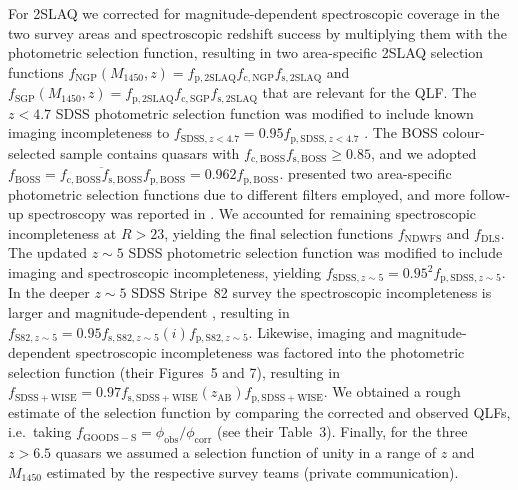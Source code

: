 \documentclass[fleqn,usenatbib]{mnras}
\begin{document}
For 2SLAQ we corrected for magnitude-dependent spectroscopic coverage
in the two survey areas \citep[$f_\mathrm{c,NGP}\left(g\right)$ and
  $f_\mathrm{c,SGP}\left(g\right)$; Figure~4
  in][]{2009MNRAS.392...19C} and spectroscopic redshift success
\citep[$f_\mathrm{s,2SLAQ}\left(g\right)$; Figure~6b
  in][]{2009MNRAS.392...19C} by multiplying them with the photometric
selection function, resulting in two area-specific 2SLAQ selection
functions
$f_\mathrm{NGP}\left(M_{1450},z\right)=f_\mathrm{p,2SLAQ}f_\mathrm{c,NGP}f_\mathrm{s,2SLAQ}$
and
$f_\mathrm{SGP}\left(M_{1450},z\right)=f_\mathrm{p,2SLAQ}f_\mathrm{c,SGP}f_\mathrm{s,2SLAQ}$
that are relevant for the QLF.  The $z<4.7$ SDSS photometric selection
function was modified to include known imaging incompleteness to
$f_{\mathrm{SDSS},z<4.7}=0.95f_{\mathrm{p,SDSS},z<4.7}$
\citep{2006AJ....131.2766R}. The BOSS colour-selected sample \citep{2013ApJ...773...14R} contains
quasars with $f_\mathrm{c,BOSS}f_\mathrm{s,BOSS}\ge 0.85$, and we adopted
$f_\mathrm{BOSS}=\overline{f_\mathrm{c,BOSS}f_\mathrm{s,BOSS}}f_\mathrm{p,BOSS}=0.962f_\mathrm{p,BOSS}$. \citet{2010ApJ...710.1498G}
presented two area-specific photometric selection functions due to
different filters employed, and more follow-up spectroscopy was
reported in \citet{2011ApJ...728L..26G}. We accounted for remaining
spectroscopic incompleteness at $R>23$, yielding the final selection
functions $f_\mathrm{NDWFS}$ and $f_\mathrm{DLS}$. The updated $z\sim
5$ SDSS photometric selection function \citep{2013ApJ...768..105M} was
modified to include imaging and spectroscopic incompleteness, yielding
$f_{\mathrm{SDSS},z\sim 5}=0.95^2f_{\mathrm{p,SDSS},z\sim 5}$. In the
deeper $z\sim 5$ SDSS Stripe~82 survey the spectroscopic
incompleteness is larger and magnitude-dependent \citep[Figure~14
  in][]{2013ApJ...768..105M}, resulting in $f_{\mathrm{S82},z\sim
  5}=0.95f_{\mathrm{s,S82},z\sim
  5}\left(i\right)f_{\mathrm{p,S82},z\sim 5}$. Likewise, imaging and
magnitude-dependent spectroscopic incompleteness was factored into the
\citet{2016ApJ...829...33Y} photometric selection function (their
Figures~5 and 7), resulting in
$f_\mathrm{SDSS+WISE}=0.97f_\mathrm{s,SDSS+WISE}\left(z_\mathrm{AB}\right)f_\mathrm{p,SDSS+WISE}$.
We obtained a rough estimate of the \citet{2015AA...578A..83G}
selection function by comparing the corrected and observed QLFs,
i.e.\ taking $f_\mathrm{GOODS-S}=\phi_\mathrm{obs}/\phi_\mathrm{corr}$
(see their Table~3).  Finally, for the three $z>6.5$ quasars we
assumed a selection function of unity in a range of $z$ and $M_{1450}$
estimated by the respective survey teams (private communication).
\end{document}
